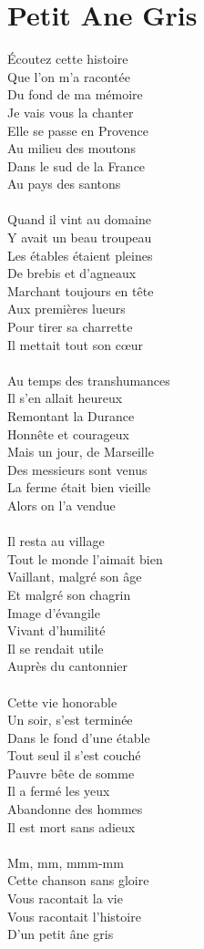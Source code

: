 \section*{Petit Ane Gris}
Écoutez cette histoire\\
Que l'on m'a racontée\\
Du fond de ma mémoire\\
Je vais vous la chanter\\
Elle se passe en Provence\\
Au milieu des moutons\\
Dans le sud de la France\\
Au pays des santons\\\\
Quand il vint au domaine\\
Y avait un beau troupeau\\
Les étables étaient pleines\\
De brebis et d'agneaux\\
Marchant toujours en tête\\
Aux premières lueurs\\
Pour tirer sa charrette\\
Il mettait tout son cœur\\\\
Au temps des transhumances\\
Il s'en allait heureux\\
Remontant la Durance\\
Honnête et courageux\\
Mais un jour, de Marseille\\
Des messieurs sont venus\\
La ferme était bien vieille\\
Alors on l'a vendue\\\\
Il resta au village\\
Tout le monde l'aimait bien\\
Vaillant, malgré son âge\\
Et malgré son chagrin\\
Image d'évangile\\
Vivant d'humilité\\
Il se rendait utile\\
Auprès du cantonnier\\\\
Cette vie honorable\\
Un soir, s'est terminée\\
Dans le fond d'une étable\\
Tout seul il s'est couché\\
Pauvre bête de somme\\
Il a fermé les yeux\\
Abandonne des hommes\\
Il est mort sans adieux\\\\
Mm, mm, mmm-mm\\
Cette chanson sans gloire\\
Vous racontait la vie\\
Vous racontait l'histoire\\
D'un petit âne gris\\